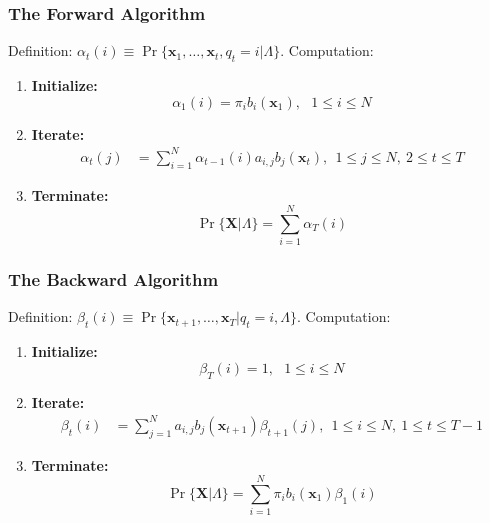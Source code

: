 \documentclass{beamer}
\begin{document}
\begin{frame}
  \frametitle{The Forward Algorithm}

  Definition: $\alpha_t(i) \equiv \Pr\{\mathbf{x}_1,\ldots,\mathbf{x}_t,q_t=i|\Lambda\}$.  Computation:
  \begin{enumerate}
  \item {\bf Initialize:}
    \[
    \alpha_1(i) = \pi_i b_i(\mathbf{x}_1),~~~1\le i\le N
    \]
  \item {\bf Iterate:}
    \begin{align*}
      \alpha_{t}(j) &= \sum_{i=1}^N \alpha_{t-1}(i) a_{i,j}b_j(\mathbf{x}_t),~~1\le j\le N,~2\le t\le T
    \end{align*}
  \item {\bf Terminate:}
    \[
    \Pr\{\mathbf{X}|\Lambda\} = \sum_{i=1}^N \alpha_T(i)
    \]
  \end{enumerate}
\end{frame}
  
\begin{frame}
  \frametitle{The Backward Algorithm}

  Definition: $\beta_t(i) \equiv \Pr\{\mathbf{x}_{t+1},\ldots,\mathbf{x}_T|q_t=i,\Lambda\}$.  Computation:
  \begin{enumerate}
  \item {\bf Initialize:}
    \[
    \beta_T(i) = 1,~~~1\le i\le N
    \]
  \item {\bf Iterate:}
    \begin{align*}
      \beta_{t}(i) &= \sum_{j=1}^N a_{i,j}b_j(\mathbf{x}_{t+1})\beta_{t+1}(j),~~1\le i\le N,~1\le t\le T-1
    \end{align*}
  \item {\bf Terminate:}
    \[
    \Pr\{\mathbf{X}|\Lambda\} = \sum_{i=1}^N \pi_ib_i(\mathbf{x}_1)\beta_1(i)
    \]
  \end{enumerate}
\end{frame}
\end{document}
